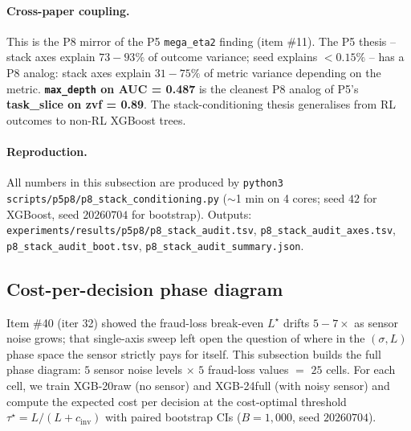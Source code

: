 \documentclass{article}
\begin{document}
\paragraph{Cross-paper coupling.}
This is the P8 mirror of the P5 \texttt{mega\_eta2} finding
(item \#11). The P5 thesis -- stack axes explain $73{-}93\%$ of outcome
variance; seed explains $<0.15\%$ -- has a P8 analog: stack axes explain
$31{-}75\%$ of metric variance depending on the metric.
\textbf{\texttt{max\_depth} on AUC = 0.487} is the cleanest P8 analog of
P5's \textbf{task\_slice on zvf = 0.89}. The stack-conditioning thesis
generalises from RL outcomes to non-RL XGBoost trees.

\paragraph{Reproduction.} All numbers in this subsection are produced
by \texttt{python3 scripts/p5p8/p8\_stack\_conditioning.py} ($\sim$1 min
on 4 cores; seed $42$ for XGBoost, seed $20260704$ for bootstrap).
Outputs:
\texttt{experiments/results/p5p8/p8\_stack\_audit.tsv},
\texttt{p8\_stack\_audit\_axes.tsv},
\texttt{p8\_stack\_audit\_boot.tsv},
\texttt{p8\_stack\_audit\_summary.json}.

\subsection{Cost-per-decision phase diagram}

Item \#40 (iter 32) showed the fraud-loss break-even $L^\star$ drifts
$5{-}7\times$ as sensor noise grows; that single-axis sweep left open the
question of where in the $(\sigma, L)$ phase space the sensor strictly
pays for itself. This subsection builds the full phase diagram:
$5$ sensor noise levels $\times$ $5$ fraud-loss values $=$ $25$ cells.
For each cell, we train XGB-20raw (no sensor) and XGB-24full (with
noisy sensor) and compute the expected cost per decision at the
cost-optimal threshold $\tau^\star = L / (L + c_\text{inv})$ with paired
bootstrap CIs ($B{=}1{,}000$, seed $20260704$).
\end{document}
